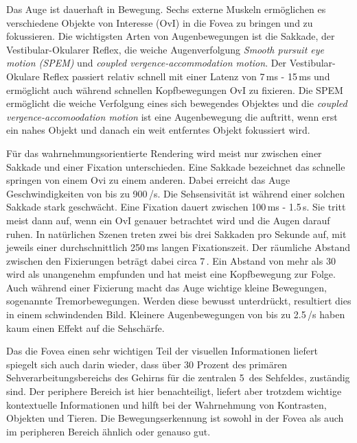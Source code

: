 Das Auge ist dauerhaft in Bewegung.
Sechs externe Muskeln ermöglichen es verschiedene Objekte von Interesse (OvI) in die Fovea zu bringen und zu fokussieren.
Die wichtigsten Arten von Augenbewegungen ist die Sakkade, der Vestibular-Okularer Reflex, die weiche Augenverfolgung \emph{Smooth pursuit eye motion (SPEM)} und \emph{coupled vergence-accommodation motion}.
Der Vestibular-Okulare Reflex passiert relativ schnell mit einer Latenz von 7\,ms - 15\,ms und ermöglicht auch während schnellen Kopfbewegungen OvI zu fixieren.
Die SPEM ermöglicht die weiche Verfolgung eines sich bewegendes Objektes und die \emph{coupled vergence-accomoodation motion} ist eine Augenbewegung die auftritt, wenn erst ein nahes Objekt und danach ein weit entferntes Objekt fokussiert wird.

Für das wahrnehmungsorientierte Rendering wird meist nur zwischen einer Sakkade und einer Fixation unterschieden.
Eine Sakkade bezeichnet das schnelle springen von einem Ovi zu einem anderen.
Dabei erreicht das Auge Geschwindigkeiten von bis zu 900\,\textdegree/s.
Die Sehsensivität ist während einer solchen Sakkade stark geschwächt.
Eine Fixation dauert zwischen 100\,ms - 1.5\,s.
Sie tritt meist dann auf, wenn ein OvI genauer betrachtet wird und die Augen darauf ruhen.
In natürlichen Szenen treten zwei bis drei Sakkaden pro Sekunde auf, mit jeweils einer durchschnittlich 250\,ms langen Fixationszeit.
Der räumliche Abstand zwischen den Fixierungen beträgt dabei circa 7\,\textdegree{}.
Ein Abstand von mehr als 30\,\textdegree{} wird als unangenehm empfunden und hat meist eine Kopfbewegung zur Folge.
Auch während einer Fixierung macht das Auge wichtige kleine Bewegungen, sogenannte Tremorbewegungen.
Werden diese bewusst unterdrückt, resultiert dies in einem schwindenden Bild.
Kleinere Augenbewegungen von bis zu 2.5\,\textdegree{}/s haben kaum einen Effekt auf die Sehschärfe.

Das die Fovea einen sehr wichtigen Teil der visuellen Informationen liefert spiegelt sich auch darin wieder, dass über 30 Prozent des primären Sehverarbeitungsbereichs des Gehirns für die zentralen 5\,\textdegree{} des Sehfeldes, zuständig sind.
Der periphere Bereich ist hier benachteiligt, liefert aber trotzdem wichtige kontextuelle Informationen und hilft bei der Wahrnehmung von Kontrasten, Objekten und Tieren.
Die Bewegungserkennung ist sowohl in der Fovea als auch im peripheren Bereich ähnlich oder genauso gut.

